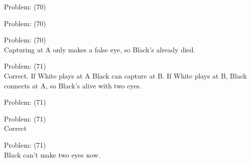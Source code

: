 \documentclass[11pt]{article}
\begin{document}
\begin{minipage}[t]{0.5\textwidth}
  {\centering
  
Problem: (70)\\
  }
\end{minipage}
\begin{minipage}[t]{0.5\textwidth}
  {\centering
  
Problem: (70)\\
  }
\end{minipage}
\begin{minipage}[t]{0.5\textwidth}
  {\centering
  
Problem: (70)\\
Capturing at A only makes a false eye, so Black's already died.\\
  }
\end{minipage}
\begin{minipage}[t]{0.5\textwidth}
  {\centering
  
Problem: (71)\\
Correct. If White plays at A Black can capture at B. If White plays at B, Black connects at A, so Black's alive with two eyes.\\
  }
\end{minipage}
\begin{minipage}[t]{0.5\textwidth}
  {\centering
  
Problem: (71)\\
  }
\end{minipage}
\begin{minipage}[t]{0.5\textwidth}
  {\centering
  
Problem: (71)\\
Correct\\
  }
\end{minipage}
\begin{minipage}[t]{0.5\textwidth}
  {\centering
  
Problem: (71)\\
Black can't make two eyes now.\\
  }
\end{minipage}
\end{document}
